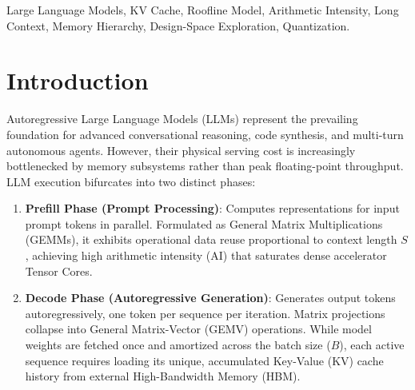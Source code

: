 \documentclass[conference,onecolumn]{IEEEtran}
\begin{document}
\begin{abstract}
In this work, we present \texttt{kvroofline}, a verified, parameterised, two-group hierarchical roofline evaluation and design-space exploration framework for long-context LLM decode. Validated against NVIDIA Nsight Compute hardware counters and real GPU latency profiling across 29 hardware-model configurations, our model achieves a $3.3\%$ Mean Absolute Percentage Error (MAPE) on HBM memory traffic and $12.9\%$ held-out MAPE on decode token latency (TPOT). Sweeping over 1,100 configurations per regime across 6 modern LLM architectures (including LLaMA-3.1-8B, LLaMA-3-70B, Qwen-2.5-7B, and DeepSeek-V2) under empirical accuracy constraints ($\le 1.0\%$ perplexity degradation), we show that: (1) In Regime A ($\le 8\text{k}$), execution is weight-dominated, where $+2$ HBM stacks plus FP8 KV yield $1.71\times$--$1.92\times$ speedup while SRAM scaling yields $<1.05\times$ for $263\text{ mm}^2$; (2) In Regime B ($128\text{k}$), INT4 group-quantized KV combined with dynamic token eviction delivers $6.23\times$ speedup at $0\text{ mm}^2$ added die area by expanding feasible batch concurrency $B: 3 \to 8$; (3) In Regime C ($512\text{k}+$ on 2 GPUs), aggressive KV compression is mandatory for physical feasibility, yielding $11.15\times$--$16.96\times$ speedup; and (4) Hardware-software co-design expands the 3D Pareto hypervolume by $+32.9\%$ to $+184.2\%$ over the union of isolated hardware or software point designs.
\end{abstract}

\begin{IEEEkeywords}
Large Language Models, KV Cache, Roofline Model, Arithmetic Intensity, Long Context, Memory Hierarchy, Design-Space Exploration, Quantization.
\end{IEEEkeywords}

\section{Introduction}
Autoregressive Large Language Models (LLMs) represent the prevailing foundation for advanced conversational reasoning, code synthesis, and multi-turn autonomous agents. However, their physical serving cost is increasingly bottlenecked by memory subsystems rather than peak floating-point throughput. LLM execution bifurcates into two distinct phases:
\begin{enumerate}
    \item \textbf{Prefill Phase (Prompt Processing)}: Computes representations for input prompt tokens in parallel. Formulated as General Matrix Multiplications (GEMMs), it exhibits operational data reuse proportional to context length $S$, achieving high arithmetic intensity (AI) that saturates dense accelerator Tensor Cores.
    \item \textbf{Decode Phase (Autoregressive Generation)}: Generates output tokens autoregressively, one token per sequence per iteration. Matrix projections collapse into General Matrix-Vector (GEMV) operations. While model weights are fetched once and amortized across the batch size ($B$), each active sequence requires loading its unique, accumulated Key-Value (KV) cache history from external High-Bandwidth Memory (HBM).
\end{enumerate}
\end{document}
